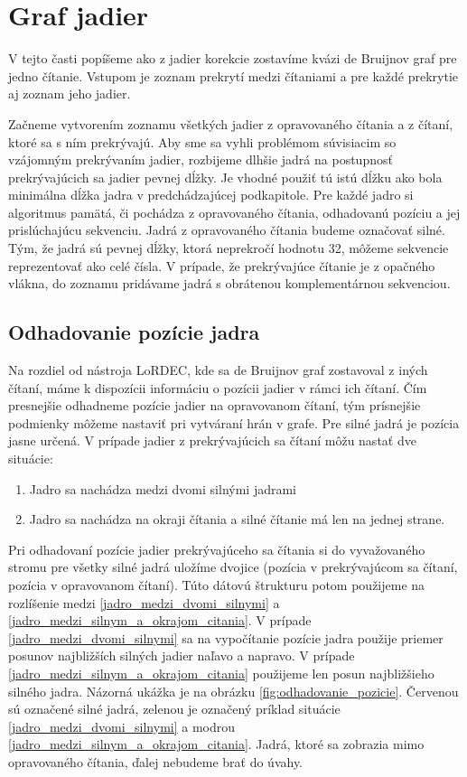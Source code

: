 \section{Graf jadier}

V tejto časti popíšeme ako z jadier korekcie zostavíme kvázi de Bruijnov graf pre jedno čítanie. Vstupom je zoznam prekrytí medzi čítaniami a pre každé prekrytie aj zoznam jeho jadier. 

Začneme vytvorením zoznamu všetkých jadier z opravovaného čítania a z čítaní, ktoré sa s ním prekrývajú. Aby sme sa vyhli problémom súvisiacim so vzájomným prekrývaním jadier, rozbijeme dlhšie jadrá na postupnosť prekrývajúcich sa jadier pevnej dĺžky. Je vhodné použiť tú istú dĺžku ako bola minimálna dĺžka jadra v predchádzajúcej podkapitole. Pre každé jadro si algoritmus pamätá, či pochádza z opravovaného čítania, odhadovanú pozíciu a jej prislúchajúcu sekvenciu. Jadrá z opravovaného čítania budeme označovať silné. Tým, že jadrá sú pevnej dĺžky, ktorá neprekročí hodnotu 32, môžeme sekvencie reprezentovať ako celé čísla. V prípade, že prekrývajúce čítanie je z opačného vlákna, do zoznamu pridávame jadrá s obrátenou komplementárnou sekvenciou.

\subsection{Odhadovanie pozície jadra}

Na rozdiel od nástroja LoRDEC, kde sa de Bruijnov graf zostavoval z iných čítaní, máme k dispozícii informáciu o pozícii jadier v rámci ich čítaní. Čím presnejšie odhadneme pozície jadier na opravovanom čítaní, tým prísnejšie podmienky môžeme nastaviť pri vytváraní hrán v grafe. Pre silné jadrá je pozícia jasne určená. V prípade jadier z prekrývajúcich sa čítaní môžu nastať dve situácie:

\begin{enumerate}[label={S.\arabic*}]
\item \label{jadro_medzi_dvomi_silnymi} Jadro sa nachádza medzi dvomi silnými jadrami
\item \label{jadro_medzi_silnym_a_okrajom_citania} Jadro sa nachádza na okraji čítania a silné čítanie má len na jednej strane.
\end{enumerate}

Pri odhadovaní pozície jadier prekrývajúceho sa čítania si do vyvažovaného stromu pre všetky silné jadrá uložíme dvojice (pozícia v prekrývajúcom sa čítaní, pozícia v opravovanom čítaní). Túto dátovú štrukturu potom použijeme na rozlíšenie medzi \ref{jadro_medzi_dvomi_silnymi} a \ref{jadro_medzi_silnym_a_okrajom_citania}. V prípade \ref{jadro_medzi_dvomi_silnymi} sa na vypočítanie pozície jadra použije priemer posunov najbližších silných jadier naľavo a napravo. V prípade \ref{jadro_medzi_silnym_a_okrajom_citania} použijeme len posun najbližšieho silného jadra. Názorná ukážka je na obrázku \ref{fig:odhadovanie_pozicie}. Červenou sú označené silné jadrá, zelenou je označený príklad situácie \ref{jadro_medzi_dvomi_silnymi} a modrou \ref{jadro_medzi_silnym_a_okrajom_citania}. Jadrá, ktoré sa zobrazia mimo opravovaného čítania, ďalej nebudeme brať do úvahy.

